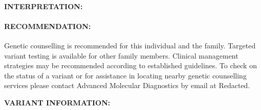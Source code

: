 \documentclass[10pt]{extarticle}
\newcommand{\data}[1]{}
\begin{document}
\paragraph{INTERPRETATION:} \data{plugin:summary_blurb}

\paragraph{RECOMMENDATION:} Genetic counselling is recommended for this individual and the family. Targeted variant testing is available for other family members. Clinical management strategies may be recommended according to established guidelines. To check on the status of a variant or for assistance in locating nearby genetic counselling services please contact Advanced Molecular Diagnostics by email at Redacted.

{\bf VARIANT INFORMATION:}\\
\data{plugin:long_blurb}


\end{document}
